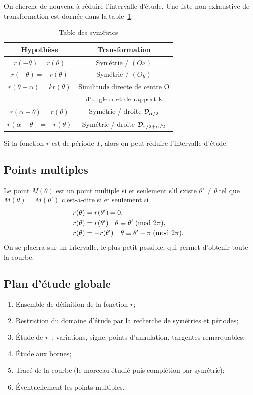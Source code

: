 On cherche de nouveau à réduire l'intervalle d'étude. Une liste non exhaustive 
de transformation est donnée dans la table~\ref{tab:sympol}.
\begin{table}
  \centering
  \begin{tabular}{|c|c|}    \hline
    Hypothèse & Transformation \\
    \hline
    \(r(-\theta)=r(\theta)\) & Symétrie / \((Ox)\) \\
    \hline
    \(r(-\theta)=-r(\theta)\) & Symétrie / \((Oy)\) \\
    \hline
    \(r(\theta + \alpha)=kr(\theta)\) & Similitude directe de centre O \\ & 
    d'angle \(\alpha\) et de rapport k \\ \hline
    \(r(\alpha-\theta)=r(\theta)\) & Symétrie / droite \(\mathcal{D}_{\alpha/2}\) \\ 
    \hline
    \(r(\alpha-\theta)=-r(\theta)\) & Symétrie / droite \(\mathcal{D}_{\pi/2 + 
    \alpha/2}\) \\
    \hline
  \end{tabular}
  \caption{Table des symétries}
  \label{tab:sympol}
\end{table}
Si la fonction \(r\) est de période \(T\), alors on peut réduire l'intervalle 
d'étude.
\subsection{Points multiples}
Le point \(M(\theta)\) est un point multiple si et seulement s'il existe 
\(\theta' \neq \theta\) tel que \(M(\theta) = M(\theta')\) c'est-à-dire si et 
seulement si
\begin{align}
  r(\theta)&=r(\theta')=0, \\
  r(\theta)&=r(\theta') \quad \theta \equiv \theta'\!\pmod {2\pi},\\
  r(\theta)&=-r(\theta') \quad \theta \equiv \theta'+\pi\!\pmod {2\pi}.
\end{align}
On se placera sur un intervalle, le plus petit possible, qui permet d'obtenir 
toute la courbe.

\subsection{Plan d'étude globale}
\begin{enumerate}
  \item Ensemble de définition de la fonction \(r\);
  \item Restriction du domaine d'étude par la recherche de symétries et 
    périodes;
  \item Étude de \(r\)~: variations, signe, points d'annulation, tangentes 
    remarquables;
  \item Étude aux bornes;
  \item Tracé de la courbe (le morceau étudié puis complétion par symétrie);
  \item Éventuellement les points multiples.
\end{enumerate}

